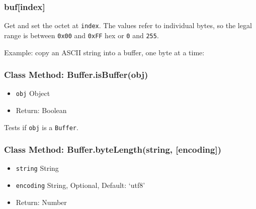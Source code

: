 \subsubsection{buf{[}index{]}}

Get and set the octet at \texttt{index}. The values refer to individual
bytes, so the legal range is between \texttt{0x00} and \texttt{0xFF} hex
or \texttt{0} and \texttt{255}.

Example: copy an ASCII string into a buffer, one byte at a time:

\begin{Shaded}
\begin{Highlighting}[]
\NormalTok{;}
 \NormalTok{);}

 \NormalTok{(}  
\NormalTok{\}}


\end{Highlighting}
\end{Shaded}

\subsubsection{Class Method: Buffer.isBuffer(obj)}

\begin{itemize}
\item
  \texttt{obj} Object
\item
  Return: Boolean
\end{itemize}

Tests if \texttt{obj} is a \texttt{Buffer}.

\subsubsection{Class Method: Buffer.byteLength(string, {[}encoding{]})}

\begin{itemize}
\item
  \texttt{string} String
\item
  \texttt{encoding} String, Optional, Default: `utf8'
\item
  Return: Number
\end{itemize}

